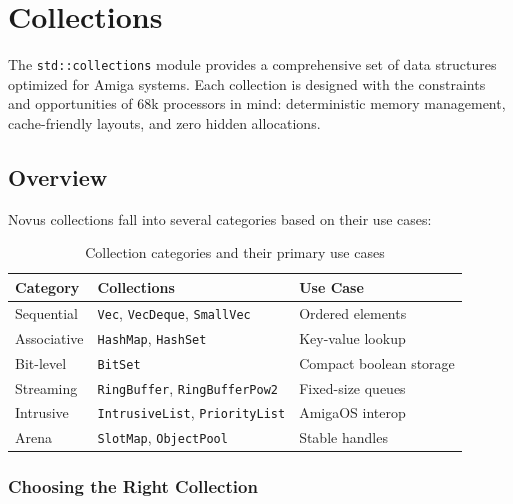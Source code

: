 \chapter{Collections}
\label{chap:collections}

The \texttt{std::collections} module provides a comprehensive set of data structures optimized for Amiga systems. Each collection is designed with the constraints and opportunities of 68k processors in mind: deterministic memory management, cache-friendly layouts, and zero hidden allocations.

\section{Overview}

Novus collections fall into several categories based on their use cases:

\begin{table}[h]
\centering
\begin{tabular}{lll}
\textbf{Category} & \textbf{Collections} & \textbf{Use Case} \\
\hline
Sequential & \texttt{Vec}, \texttt{VecDeque}, \texttt{SmallVec} & Ordered elements \\
Associative & \texttt{HashMap}, \texttt{HashSet} & Key-value lookup \\
Bit-level & \texttt{BitSet} & Compact boolean storage \\
Streaming & \texttt{RingBuffer}, \texttt{RingBufferPow2} & Fixed-size queues \\
Intrusive & \texttt{IntrusiveList}, \texttt{PriorityList} & AmigaOS interop \\
Arena & \texttt{SlotMap}, \texttt{ObjectPool} & Stable handles \\
\end{tabular}
\caption{Collection categories and their primary use cases}
\end{table}

\subsection{Choosing the Right Collection}

